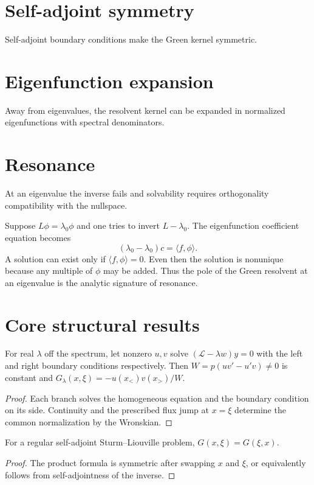 \section{Self-adjoint symmetry}
Self-adjoint boundary conditions make the Green kernel symmetric.

\section{Eigenfunction expansion}
Away from eigenvalues, the resolvent kernel can be expanded in normalized eigenfunctions with spectral denominators.

\section{Resonance}
At an eigenvalue the inverse fails and solvability requires orthogonality compatibility with the nullspace.


\begin{example}\label{ex:iii26-expand-03}
Suppose \(L\phi=\lambda_0\phi\) and one tries to invert \(L-\lambda_0\).
The eigenfunction coefficient equation becomes
\[
(\lambda_0-\lambda_0)c=\langle f,\phi\rangle.
\]
A solution can exist only if \(\langle f,\phi\rangle=0\). Even then the
solution is nonunique because any multiple of \(\phi\) may be added. Thus the
pole of the Green resolvent at an eigenvalue is the analytic signature of
resonance.
\end{example}
\section{Core structural results}

\begin{theorem}\label{thm:iii26-01}
For real $\lambda$ off the spectrum, let nonzero $u,v$ solve $(\mathcal L-\lambda w)y=0$ with the left and right boundary conditions respectively. Then $W=p(uv'-u' v)\ne0$ is constant and $G_\lambda(x,\xi)=-u(x_<)v(x_>)/W$.
\begin{proof}
Each branch solves the homogeneous equation and the boundary condition on its side. Continuity and the prescribed flux jump at $x=\xi$ determine the common normalization by the Wronskian.
\end{proof}
\end{theorem}

\begin{theorem}[Symmetry]\label{thm:iii26-02}
For a regular self-adjoint Sturm--Liouville problem, $G(x,\xi)=G(\xi,x)$.
\begin{proof}
The product formula is symmetric after swapping $x$ and $\xi$, or equivalently follows from self-adjointness of the inverse.
\end{proof}
\end{theorem}

